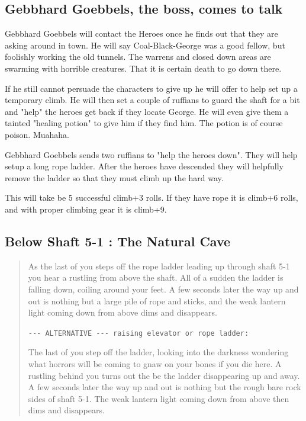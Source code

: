 \documentclass[11pt, twoside, titlepage, a4paper]{report}
\newenvironment{readoutloud}%
{\begin{quote}\begin{itshape}}%
{\end{itshape}\end{quote}}%
\begin{document}
\subsection*{Gebbhard Goebbels, the boss, comes to talk}
Gebbhard Goebbels will contact the Heroes once he finds out that they are asking around in town. He will say Coal-Black-George was a good fellow, but foolishly working the old tunnels. The warrens and closed down areas are swarming with horrible creatures. That it is certain death to go down there.

If he still cannot persuade the characters to give up he will offer to help set up a temporary climb. He will then set a couple of ruffians to guard the shaft for a bit and "help" the heroes get back if they locate George. He will even give them a tainted "healing potion" to give him if they find him. The potion is of course poison. Muahaha.

Gebbhard Goebbels sends two ruffians to "help the heroes down". They will help setup a long rope ladder. After the heroes have descended they will helpfully remove the ladder so that they must climb up the hard way.

This will take be 5 successful climb+3 rolls. If they have rope it is climb+6 rolls, and with proper climbing gear it is climb+9.


\subsection*{Below Shaft 5-1 : The Natural Cave}
\begin{readoutloud}
As the last of you steps off the rope ladder leading up through shaft 5-1 you hear a rustling from above the shaft. All of a sudden the ladder is falling down, coiling around your feet. A few seconds later the way up and out is nothing but a large pile of rope and sticks, and the weak lantern light coming down from above dims and disappears.

\verb|--- ALTERNATIVE --- raising elevator or rope ladder:|

The last of you step off the ladder, looking into the darkness wondering what horrors will be coming to gnaw on your bones if you die here. A rustling behind you turns out the be the ladder disappearing up and away. A few seconds later the way up and out is nothing but the rough bare rock sides of shaft 5-1. The weak lantern light coming down from above then dims and disappears.
\end{readoutloud}
\end{document}

